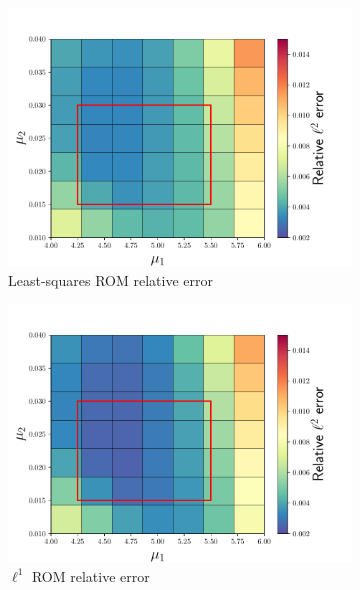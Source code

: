 \documentclass[3p,computermodern,10pt]{elsarticle}
\begin{document}
\begin{figure}
\begin{center}
\begin{subfigure}[t]{0.32\textwidth}
\includegraphics[trim={0cm 0cm 0cm 0cm},clip,width=1.0\linewidth]{code/burgers/synapse_models/elu/results/uls_error_vs_param.pdf} 
\caption{Least-squares ROM relative error}
\end{subfigure}
\begin{subfigure}[t]{0.32\textwidth}
\includegraphics[trim={0cm 0cm 0cm 0cm},clip,width=1.0\linewidth]{code/burgers/synapse_models/elu/results/ul1_error_vs_param.pdf} 
\caption{$\ell^1$ ROM relative error}
\end{subfigure}
\begin{subfigure}[t]{0.32\textwidth}

\end{subfigure}
\end{center}
\end{figure}
\end{document}

